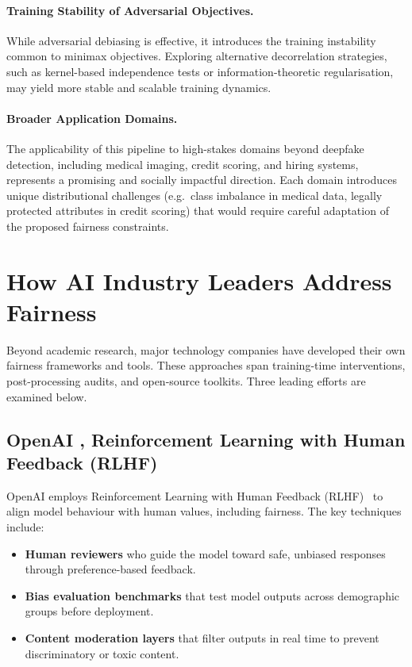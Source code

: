 \paragraph{Training Stability of Adversarial Objectives.}
While adversarial debiasing is effective, it introduces the training
instability common to minimax objectives.
Exploring alternative decorrelation strategies, such as kernel-based
independence tests or information-theoretic regularisation, may yield more
stable and scalable training dynamics.

\paragraph{Broader Application Domains.}
The applicability of this pipeline to high-stakes domains beyond deepfake
detection, including medical imaging, credit scoring, and hiring
systems, represents a promising and socially impactful direction.
Each domain introduces unique distributional challenges (e.g.\ class imbalance
in medical data, legally protected attributes in credit scoring) that would
require careful adaptation of the proposed fairness constraints.

\section{How AI Industry Leaders Address Fairness}

Beyond academic research, major technology companies have developed their own
fairness frameworks and tools.
These approaches span training-time interventions, post-processing audits, and
open-source toolkits.
Three leading efforts are examined below.

\subsection{OpenAI ,  Reinforcement Learning with Human Feedback (RLHF)}

OpenAI employs Reinforcement Learning with Human Feedback
(RLHF)~\cite{ouyang2022rlhf} to align model behaviour with human values,
including fairness.
The key techniques include:

\begin{itemize}[leftmargin=2em]
    \item \textbf{Human reviewers} who guide the model toward safe, unbiased
          responses through preference-based feedback.
    \item \textbf{Bias evaluation benchmarks} that test model outputs across
          demographic groups before deployment.
    \item \textbf{Content moderation layers} that filter outputs in real time
          to prevent discriminatory or toxic content.
\end{itemize}

